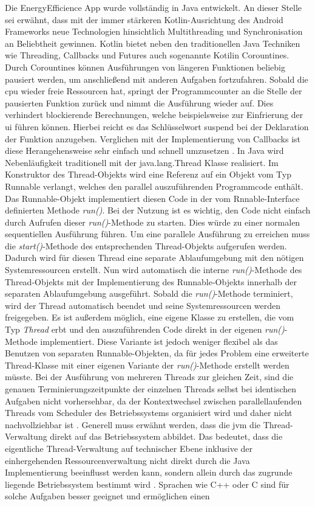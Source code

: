 Die \glqq EnergyEfficience\grqq{} App wurde vollständig in Java entwickelt. An dieser Stelle sei erwähnt, dass mit der immer stärkeren Kotlin-Ausrichtung des Android Frameworks neue Technologien hinsichtlich Multithreading und Synchronisation an Beliebtheit gewinnen. Kotlin bietet neben den traditionellen Java Techniken wie Threading, Callbacks und Futures auch sogenannte Kotilin Corountines. Durch Corountines können Ausführungen von längeren Funktionen beliebig pausiert werden, um anschließend mit anderen Aufgaben fortzufahren. Sobald die \ac{cpu} wieder freie Ressourcen hat, springt der Programmcounter an die Stelle der pausierten Funktion zurück und nimmt die Ausführung wieder auf. Dies verhindert blockierende Berechnungen, welche beispielsweise zur Einfrierung der \ac{ui} führen können. Hierbei reicht es das Schlüsselwort \glqq suspend\grqq{} bei der Deklaration der Funktion anzugeben. Verglichen mit der Implementierung von Callbacks ist diese Herangehensweise sehr einfach und schnell umzusetzen \cite{kotlin-corountines}. In Java wird Nebenläufigkeit traditionell mit der java.lang.Thread Klasse realisiert. Im  Konstruktor des Thread-Objekts wird eine Referenz auf ein Objekt vom Typ Runnable verlangt, welches den parallel auszuführenden Programmcode enthält. Das Runnable-Objekt implementiert diesen Code in der vom Rnnable-Interface definierten Methode \emph{run()}. Bei der Nutzung ist es wichtig, den Code nicht einfach durch Aufrufen dieser \emph{run()}-Methode zu starten. Dies würde zu einer normalen sequentiellen Ausführung führen. Um eine parallele Ausführung zu erreichen muss die \emph{start()}-Methode des entsprechenden Thread-Objekts aufgerufen werden. Dadurch wird für diesen Thread eine separate Ablaufumgebung mit den nötigen Systemressourcen erstellt. Nun wird automatisch die interne \emph{run()}-Methode des Thread-Objekts mit der Implementierung des Runnable-Objekts innerhalb der separaten Ablaufumgebung ausgeführt. Sobald die \emph{run()}-Methode terminiert, wird der Thread automatisch beendet und seine Systemressourcen werden freigegeben. Es ist außerdem möglich, eine eigene Klasse zu erstellen, die vom Typ \emph{Thread} erbt und den auszuführenden Code direkt in der eigenen \emph{run()}-Methode implementiert. Diese Variante ist jedoch weniger flexibel als das Benutzen von separaten Runnable-Objekten, da für jedes Problem eine erweiterte Thread-Klasse mit einer eigenen Variante der \emph{run()}-Methode erstellt werden müsste.  Bei der Ausführung von mehreren Threads zur gleichen Zeit, sind die genauen Terminierungszeitpunkte der einzelnen Threads selbst bei identischen Aufgaben nicht vorhersehbar, da der Kontextwechsel zwischen parallellaufenden Threads vom Scheduler des Betriebssystems organisiert wird und daher nicht nachvollziehbar ist \cite{javaistauchnurInsel}. Generell muss erwähnt werden, dass die \ac{jvm} die Thread-Verwaltung direkt auf das Betriebssystem abbildet. Das bedeutet, dass die eigentliche Thread-Verwaltung auf technischer Ebene inklusive der einhergehenden Ressourcenverwaltung nicht direkt durch die Java Implementierung beeinflusst werden kann, sondern allein durch das zugrunde liegende Betriebssystem bestimmt wird \cite{javaistauchnurInsel}. Sprachen wie C++ oder C sind für solche Aufgaben besser geeignet und ermöglichen einen 